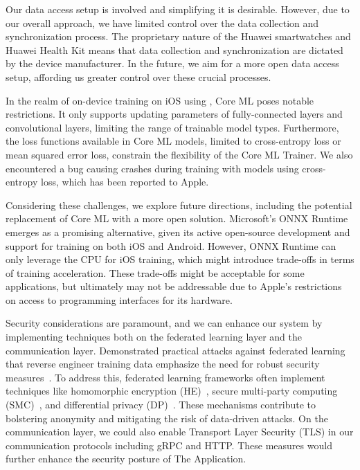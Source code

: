 Our data access setup is involved and simplifying it is desirable. However,
due to our overall approach,
we have limited control over the data collection and synchronization process.
The proprietary nature of the Huawei smartwatches and Huawei Health Kit means
that data collection and synchronization are dictated by the device
manufacturer. In the future, we aim for a more open data access setup,
affording us greater control over these crucial processes.

In the realm of on-device training on iOS using \fedkit,
Core ML poses notable restrictions.
It only supports updating parameters of fully-connected layers and convolutional
layers, limiting the range of trainable model types. Furthermore,
the loss functions available in Core ML models,
limited to cross-entropy loss or mean squared error loss,
constrain the flexibility of the Core ML Trainer. We also encountered a bug
causing crashes during training with models using cross-entropy loss,
which has been reported to Apple.

Considering these challenges, we explore future directions,
including the potential replacement of Core ML with a more open solution.
Microsoft's ONNX Runtime~\cite{onnxruntime} emerges as a promising alternative,
given its active open-source development and support for training on both iOS
and Android. However, ONNX Runtime can only leverage the CPU for iOS training,
which might introduce trade-offs in terms of training acceleration.
These trade-offs might be acceptable for some applications,
but ultimately may not be addressable due to Apple's restrictions on access to
programming interfaces for its hardware.

Security considerations are paramount,
and we can enhance our system by implementing techniques both on the federated
learning layer and the communication layer.
Demonstrated practical attacks against federated learning that reverse engineer
training data emphasize the need for robust security
measures~\cite{sun2019really}. To address this,
federated learning frameworks often implement techniques like homomorphic
encryption (HE)~\cite{wang2020homo},
secure multi-party computing (SMC)~\cite{bonawitz2016practical},
and differential privacy
(DP)~\cite{dwork2006differential,geyer2017differentially}.
These mechanisms contribute to bolstering anonymity and mitigating the risk of
data-driven attacks. On the communication layer,
we could also enable Transport Layer Security (TLS)
in our communication protocols including gRPC and HTTP. These measures would
further enhance the security posture of The \fedcampus Application.

